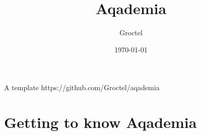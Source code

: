 \documentclass[10pt]{report}
\author{Groctel}
\title{Aqademia}
\date{\today}
\begin{document}
            {A  template}
            {https://github.com/Groctel/aqademia}
\tableofcontents


\chapter{Getting to know Aqademia}



     \pagebreak



%


\end{document}
